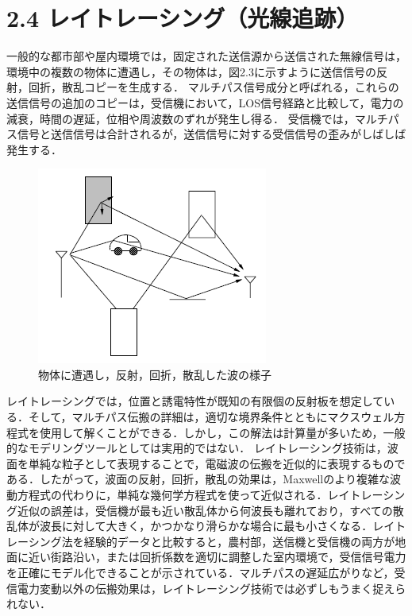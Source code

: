 \documentclass[dvipdfmx]{jsarticle}
\begin{document}
\section*{2.4 レイトレーシング（光線追跡）}
一般的な都市部や屋内環境では，固定された送信源から送信された無線信号は，環境中の複数の物体に遭遇し，その物体は，図2.3に示すように送信信号の反射，回折，散乱コピーを生成する．
マルチパス信号成分と呼ばれる，これらの送信信号の追加のコピーは，受信機において，LOS信号経路と比較して，電力の減衰，時間の遅延，位相や周波数のずれが発生し得る．
受信機では，マルチパス信号と送信信号は合計されるが，送信信号に対する受信信号の歪みがしばしば発生する．

\begin{figure}[htbp]
\begin{center}
\includegraphics[]{spring_lec/wc_ray.png}
\end{center}
\caption{物体に遭遇し，反射，回折，散乱した波の様子}
\end{figure}

レイトレーシングでは，位置と誘電特性が既知の有限個の反射板を想定している．そして，マルチパス伝搬の詳細は，適切な境界条件とともにマクスウェル方程式を使用して解くことができる．しかし，この解法は計算量が多いため，一般的なモデリングツールとしては実用的ではない．
レイトレーシング技術は，波面を単純な粒子として表現することで，電磁波の伝搬を近似的に表現するものである．したがって，波面の反射，回折，散乱の効果は，Maxwellのより複雑な波動方程式の代わりに，単純な幾何学方程式を使って近似される．レイトレーシング近似の誤差は，受信機が最も近い散乱体から何波長も離れており，すべての散乱体が波長に対して大きく，かつかなり滑らかな場合に最も小さくなる．レイトレーシング法を経験的データと比較すると，農村部\cite{ten}，送信機と受信機の両方が地面に近い街路沿い\cite{eight}\cite{seven}\cite{ten}，または回折係数を適切に調整した室内環境\cite{nine}で，受信信号電力を正確にモデル化できることが示されている．マルチパスの遅延広がりなど，受信電力変動以外の伝搬効果は，レイトレーシング技術では必ずしもうまく捉えられない\cite{eleven}．
\end{document}
